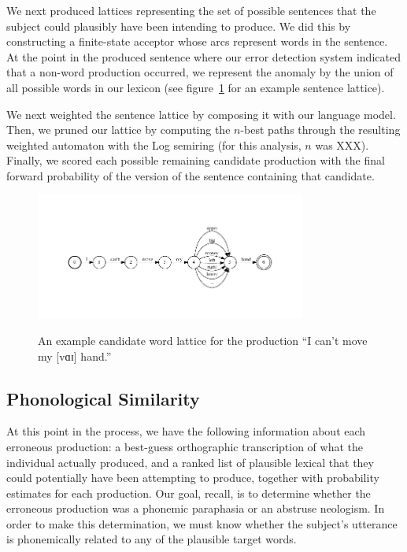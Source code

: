 \documentclass[11pt,letterpaper]{article}
\begin{document}
We next produced lattices representing the set of possible sentences that the subject could plausibly have been intending to produce. 
We did this by constructing a finite-state acceptor whose arcs represent words in the sentence.
At the point in the produced sentence where our error detection system indicated that a non-word production occurred, we represent the anomaly by the union of all possible words in our lexicon (see figure~\ref{fig:sample_lattice} for an example sentence lattice). 

We next weighted the sentence lattice by composing it with our language model.
Then, we pruned our lattice by computing the $n$-best paths through the resulting weighted automaton with the Log semiring (for this analysis, $n$ was XXX). %
Finally, we scored each possible remaining candidate production with the final forward probability of the version of the sentence containing that candidate.

\begin{figure}[t]
\centering
\includegraphics[width=3.5in]{lattice.pdf}
\label{fig:sample_lattice}
\caption{An example candidate word lattice for the production ``I can't move my [vɑɪ] hand.''}
\end{figure}


\subsection{Phonological Similarity} %
\label{sub:phonological_similarity}

At this point in the process, we have the following information about each erroneous production: a best-guess orthographic transcription of what the individual actually produced, and a ranked list of plausible lexical that they could potentially have been attempting to produce, together with probability estimates for each production.
Our goal, recall, is to determine whether the erroneous production was a phonemic paraphasia or an abstruse neologism.
In order to make this determination, we must know whether the subject's utterance is phonemically related to any of the plausible target words.
\end{document}
